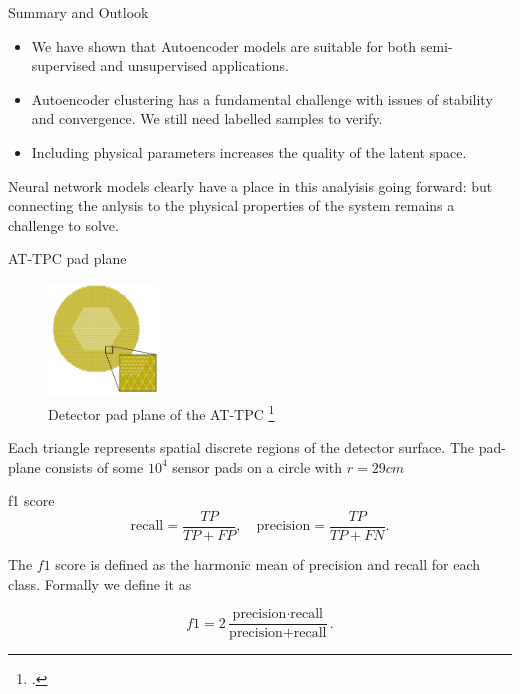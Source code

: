 \documentclass[notes]{beamer}
\begin{document}

\begin{frame}[t]{Summary and Outlook}
	\begin{itemize}
		\item We have shown that Autoencoder models are suitable for both semi-supervised and unsupervised applications.
		\item Autoencoder clustering has a fundamental challenge with issues of stability and convergence. We still need labelled samples to verify.
		\item Including physical parameters increases the quality of the latent space.
	\end{itemize}
	Neural network models clearly have a place in this analyisis going forward: but connecting the anlysis to the physical properties of the system remains a challenge to solve.
\end{frame}

\begin{frame}[t]{AT-TPC pad plane}
	\begin{figure}
		\centering
		\includegraphics[height=3cm]{../chapters/experimental_background/plots/at_tpc_padplane.png}
		\caption{Detector pad plane of the AT-TPC \footcite{Bradt2017a}}\label{fig:padplane}
	\end{figure}
	Each triangle represents spatial discrete regions of the detector surface. The pad-plane consists of some $10^4$ sensor pads on a circle with $r=29cm$
\end{frame}


\begin{frame}[t]{f1 score}
	\begin{equation}\label{eq:recall}
	\text{recall}= \frac{TP}{TP + FP}, \quad
	\text{precision} = \frac{TP}{TP + FN}.
	\end{equation}

	\noindent The $f1$ score is defined as the harmonic mean of precision and recall for each class. Formally we define it as

	\begin{equation}\label{eq:f1}
	f1 = 2 \frac{\text{precision} \cdot \text{recall}}{\text{precision} + \text{recall}}.
	\end{equation}
\end{frame}
\end{document}
